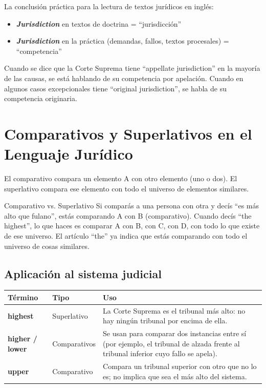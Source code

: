 \documentclass[12pt,oneside]{book}
\begin{document}
\begin{important}
La conclusión práctica para la lectura de textos jurídicos en inglés: 
\begin{itemize}
    \item \textbf{\textit{Jurisdiction}} en textos de doctrina = ``jurisdicción''
    \item \textbf{\textit{Jurisdiction}} en la práctica (demandas, fallos, textos procesales) = ``competencia''
\end{itemize}
\end{important}

Cuando se dice que la Corte Suprema tiene ``appellate jurisdiction'' en la mayoría de las causas, se está hablando de su competencia por apelación. Cuando en algunos casos excepcionales tiene ``original jurisdiction'', se habla de su competencia originaria.

\section{Comparativos y Superlativos en el Lenguaje Jurídico}

El comparativo compara un elemento A con otro elemento (uno o dos). El superlativo compara ese elemento con todo el universo de elementos similares.

\begin{example}{Comparativo vs. Superlativo}
Si comparás a una persona con otra y decís ``es más alto que fulano'', estás comparando A con B (comparativo). Cuando decís ``the highest'', lo que haces es comparar A con B, con C, con D, con todo lo que existe de ese universo. El artículo ``the'' ya indica que estás comparando con todo el universo de cosas similares.
\end{example}

\subsection*{Aplicación al sistema judicial}

\begin{table}[H]
\centering
\begin{tabularx}{\textwidth}{p{3cm} p{2.5cm} X}
\toprule
\textbf{Término} & \textbf{Tipo} & \textbf{Uso} \\
\midrule
\textbf{highest} & Superlativo & La Corte Suprema es el tribunal más alto: no hay ningún tribunal por encima de ella. \\
\midrule
\textbf{higher / lower} & Comparativos & Se usan para comparar dos instancias entre sí (por ejemplo, el tribunal de alzada frente al tribunal inferior cuyo fallo se apela). \\
\midrule
\textbf{upper} & Comparativo & Compara un tribunal superior con otro que no lo es; no implica que sea el más alto del sistema. \\
\bottomrule
\end{tabularx}
\end{table}
\end{document}
